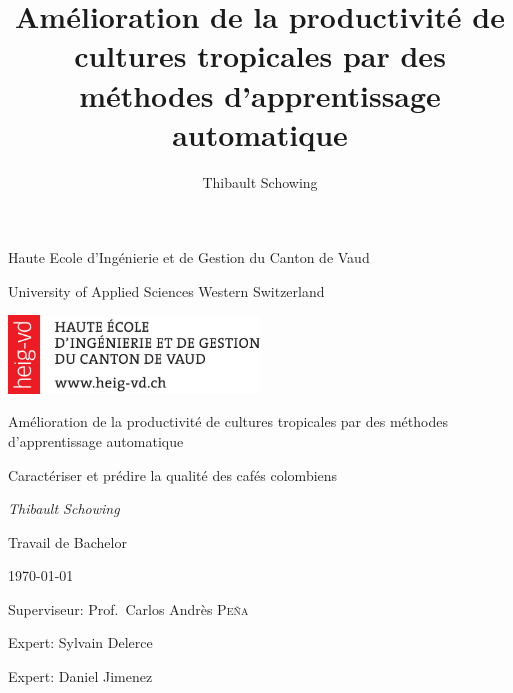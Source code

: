 \documentclass[11pt,a4paper]{report}
\author{Thibault Schowing}
\title{Amélioration de la productivité de cultures tropicales par des méthodes d'apprentissage automatique}
\newcommand\blankpage{%
	\null
	\thispagestyle{empty}%
	\addtocounter{page}{-1}%
	\newpage}
\begin{document}
	
	\begin{titlepage}
		\centering
		
		
		\small{Haute Ecole d'Ingénierie et de Gestion du Canton de Vaud  \par}
		\footnotesize{University of Applied Sciences Western Switzerland\par}
		\vspace{1cm}
		
		\includegraphics[width=0.5\textwidth]{HEIG-VD_Logo}\par
		
		\vspace{1cm}
		\Large{Amélioration de la productivité de cultures tropicales par des méthodes d'apprentissage automatique\par}
		\vspace{1.5cm}
		\small{Caractériser et prédire la qualité des cafés colombiens \par}
		\vspace{2cm}
		\small\textit{Thibault Schowing}\par
		\small{Travail de Bachelor}\par
		\small{\today\par}
		
		\vfill
		Superviseur: Prof.~Carlos Andrès \textsc{Peña}\par
		Expert: Sylvain Delerce \par
		Expert: Daniel Jimenez
		
		
	\end{titlepage}
	
	\afterpage{\blankpage}

	
	
	\afterpage{\blankpage}
	
	
	
	\afterpage{\blankpage}
	
	\tableofcontents
	
	\afterpage{\blankpage}
	
	
	
	
\end{document}
